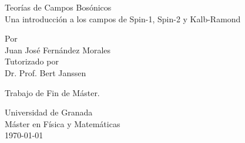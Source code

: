 \begin{titlepage}
	\begin{center}
	
		\vspace*{2cm}

		{\Huge Teorías de Campos Bosónicos} \\ %
		\vspace{3mm}
		{\Large Una introducción a los campos de Spin-1, Spin-2 y Kalb-Ramond}
		\vspace{5cm}

		{\large Por \\Juan José Fernández Morales}
		\vspace{1cm}
		{\large \\Tutorizado por \\Dr. Prof. Bert Janssen }

		\vspace{2cm}

		\vfill %

		Trabajo de Fin de Máster.
		\vspace*{3cm}

		Universidad de Granada\\
		Máster en Física y Matemáticas \\ 
		\vspace*{1mm}
		\today %
		
	\end{center}
\end{titlepage}